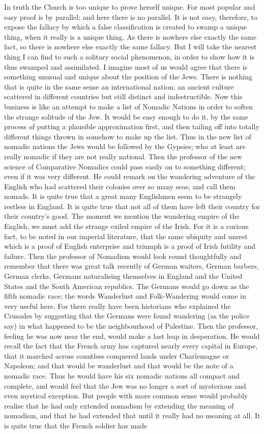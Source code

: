 In truth the Church is too unique to prove herself unique. For most popular and easy proof is by parallel; and here there is no parallel. It is not easy, therefore, to expose the fallacy by which a false classification is created to swamp a unique thing, when it really is a unique thing. As there is nowhere else exactly the same fact, so there is nowhere else exactly the same fallacy. But I will take the nearest thing I can find to such a solitary social phenomenon, in order to show how it is thus swamped and assimilated. I imagine most of us would agree that there is something unusual and unique about the position of the Jews. There is nothing that is quite in the same sense an international nation; an ancient culture scattered in different countries but still distinct and indestructible. Now this business is like an attempt to make a list of Nomadic Nations in order to soften the strange solitude of the Jew. It would be easy enough to do it, by the same process of putting a plausible approximation first, and then tailing off into totally different things thrown in somehow to make up the list. Thus in the new list of nomadic nations the Jews would be followed by the Gypsies; who at least are really nomadic if they are not really national. Then the professor of the new science of Comparative Nomadics could pass easily on to something different; even if it was very different. He could remark on the wandering adventure of the English who had scattered their colonies over so many seas; and call them nomads. It is quite true that a great many Englishmen seem to be strangely restless in England. It is quite true that not all of them have left their country for their country's good. The moment we mention the wandering empire of the English, we must add the strange exiled empire of the Irish. For it is a curious fact, to be noted in our imperial literature, that the same ubiquity and unrest which is a proof of English enterprise and triumph is a proof of Irish futility and failure. Then the professor of Nomadism would look round thoughtfully and remember that there was great talk recently of German waiters, German barbers, German clerks, Germans naturalising themselves in England and the United States and the South American republics. The Germans would go down as the fifth nomadic race; the words Wanderlust and Folk-Wandering would come in very useful here. For there really have been historians who explained the Crusades by suggesting that the Germans were found wandering (as the police say) in what happened to be the neighbourhood of Palestine. Then the professor, feeling he was now near the end, would make a last leap in desperation. He would recall the fact that the French army has captured nearly every capital in Europe, that it marched across countless conquered lands under Charlemagne or Napoleon; and that would be wanderlust and that would be the note of a nomadic race. Thus he would have his six nomadic nations all compact and complete, and would feel that the Jew was no longer a sort of mysterious and even mystical exception. But people with more common sense would probably realise that he had only extended nomadism by extending the meaning of nomadism, and that he had extended that until it really had no meaning at all. It is quite true that the French soldier has made 